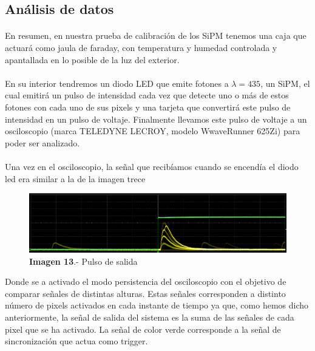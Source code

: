 \documentclass[11pt, a4paper]{article}
\begin{document}
\subsection {Análisis de datos}
\paragraph {}
En resumen, en nuestra prueba de calibración de los SiPM tenemos una caja que actuará como jaula de faraday, con temperatura y humedad controlada y apantallada en lo posible de la luz del exterior. 

\paragraph {}
En su interior tendremos un diodo LED que emite fotones a $\lambda=435$, un SiPM, el cual emitirá un pulso de intensidad cada vez que detecte uno o más de estos fotones con cada uno de sus pixels y una tarjeta que convertirá este pulso de intensidad en un pulso de voltaje. Finalmente llevamos este pulso de voltaje a un osciloscopio (marca TELEDYNE LECROY, modelo WwaveRunner 625Zi) para poder ser analizado. 

\paragraph {}
Una vez en el osciloscopio, la señal que recibíamos cuando se encendía el diodo led era similar a la de la imagen trece

\begin{figure}[hbtp]
\centering
\includegraphics[scale=0.2]{PulsoSalida.png}
\caption{\textbf{Imagen 13}.- Pulso de salida}
\end{figure}

Donde se a activado el modo persistencia del osciloscopio con el objetivo de comparar señales de distintas alturas. Estas señales corresponden a distinto número de pixels activados en cada instante de tiempo ya que, como hemos dicho anteriormente, la señal de salida del sistema es la suma de las señales de cada pixel que se ha activado. La señal de color verde corresponde a la señal de sincronización que actua como trigger.
\end{document}
